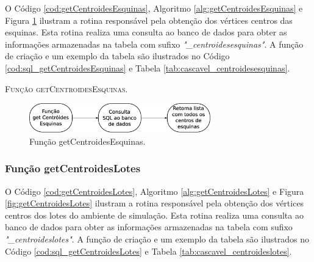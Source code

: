 O Código \ref{cod:getCentroidesEsquinas}, Algoritmo \ref{alg:getCentroidesEsquinas} e Figura \ref{fig:getCentroidesEsquinas} ilustram a rotina responsável pela obtenção dos vértices centros das esquinas. Esta rotina realiza uma consulta ao banco de dados para obter as informações armazenadas na tabela com sufixo \textit{"\_centroidesesquinas"}. A função de criação e um exemplo da tabela são ilustrados no Código \ref{cod:sql_getCentroidesEsquinas} e Tabela \ref{tab:cascavel_centroidesesquinas}. 



\begin{algorithm}[H]
   \SetAlgoLined   
   
   \caption{\textsc{Função getCentroidesEsquinas.}}
   \label{alg:getCentroidesEsquinas}
\end{algorithm}

\begin{figure}[H]
  \centering
  \includegraphics[width=0.7\textwidth]{Figuras/Simula/Fluxos/getCentroidesEsquinas.eps}
  \caption{Função getCentroidesEsquinas.}
  \label{fig:getCentroidesEsquinas}
\end{figure} 

\newpage

\subsubsection{Função getCentroidesLotes}

O Código \ref{cod:getCentroidesLotes}, Algoritmo \ref{alg:getCentroidesLotes} e Figura \ref{fig:getCentroidesLotes} ilustram a rotina responsável pela obtenção dos vértices centros dos lotes do ambiente de simulação. Esta rotina realiza uma consulta ao banco de dados para obter as informações armazenadas na tabela com sufixo \textit{"\_centroideslotes"}. A função de criação e um exemplo da tabela são ilustrados no Código \ref{cod:sql_getCentroidesLotes} e Tabela \ref{tab:cascavel_centroideslotes}. 



